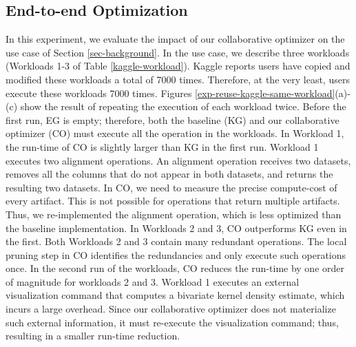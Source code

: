 \subsection{End-to-end Optimization}
In this experiment, we evaluate the impact of our collaborative optimizer on the use case of Section \ref{sec-background}.
In the use case, we describe three workloads (Workloads 1-3 of Table \ref{kaggle-workload}).
Kaggle reports users have copied and modified these workloads a total of 7000 times.
Therefore, at the very least, users execute these workloads 7000 times.
Figures \ref{exp-reuse-kaggle-same-workload}(a)-(c) show the result of repeating the execution of each workload twice.
Before the first run, EG is empty; therefore, both the baseline (KG) and our collaborative optimizer (CO) must execute all the operation in the workloads.
In Workload 1, the run-time of CO is slightly larger than KG in the first run.
Workload 1 executes two alignment operations.
An alignment operation receives two datasets, removes all the columns that do not appear in both datasets, and returns the resulting two datasets.
In CO, we need to measure the precise compute-cost of every artifact.
This is not possible for operations that return multiple artifacts.
Thus, we re-implemented the alignment operation, which is less optimized than the baseline implementation.
In Workloads 2 and 3, CO outperforms KG even in the first.
Both Workloads 2 and 3 contain many redundant operations.
The local pruning step in CO identifies the redundancies and only execute such operations once.
In the second run of the workloads, CO reduces the run-time by one order of magnitude for workloads 2 and 3.
Workload 1 executes an external visualization command that computes a bivariate kernel density estimate, which incurs a large overhead.
Since our collaborative optimizer does not materialize such external information, it must re-execute the visualization command; thus, resulting in a smaller run-time reduction.
